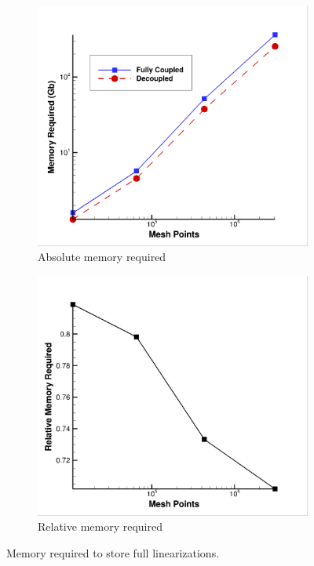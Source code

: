 \begin{figure}[h]
  \centering
	\begin{subfigure}[b]{0.45\textwidth}
    \centering
    \includegraphics[width=\textwidth]{figures/adj-efficiency/mem-req-srp.png}
    \caption{Absolute memory required}
    \label{fig:abs-mem-req}
  \end{subfigure}
	\begin{subfigure}[b]{0.45\textwidth}
    \centering
    \includegraphics[width=\textwidth]{figures/adj-efficiency/mem-rel-savings.png}
    \caption{Relative memory required}
    \label{fig:relative-mem-req}
  \end{subfigure}
  \caption{Memory required to store full linearizations.}
  \label{fig:srp-mem-req}
\end{figure}
